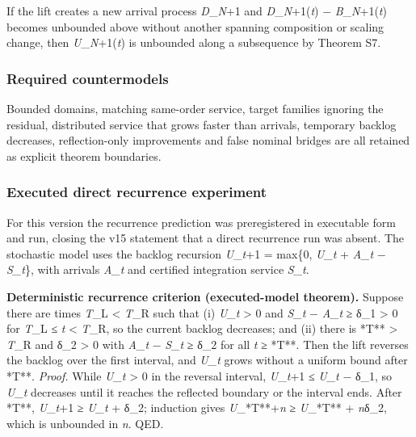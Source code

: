 If the lift creates a new arrival process \emph{D}\_\emph{N}+1 and
\emph{D}\_\emph{N}+1(\emph{t}) − \emph{B}\_\emph{N}+1(\emph{t}) becomes
unbounded above without another spanning composition or scaling change,
then \emph{U}\_\emph{N}+1(\emph{t}) is unbounded along a subsequence by
Theorem S7.

\hypertarget{required-countermodels}{%
\subsubsection{Required countermodels}\label{required-countermodels}}

Bounded domains, matching same-order service, target families ignoring
the residual, distributed service that grows faster than arrivals,
temporary backlog decreases, reflection-only improvements and false
nominal bridges are all retained as explicit theorem boundaries.

\hypertarget{executed-direct-recurrence-experiment}{%
\subsubsection{Executed direct recurrence
experiment}\label{executed-direct-recurrence-experiment}}

For this version the recurrence prediction was preregistered in
executable form and run, closing the v15 statement that a direct
recurrence run was absent. The stochastic model uses the backlog
recursion \emph{U}\_\emph{t}+1 = max\{0, \emph{U\_t} + \emph{A\_t} −
\emph{S\_t}\}, with arrivals \emph{A\_t} and certified integration
service \emph{S\_t}.

\textbf{Deterministic recurrence criterion (executed-model theorem).}
Suppose there are times \emph{T}\_L \textless{} \emph{T}\_R such that
(i) \emph{U\_t} \textgreater{} 0 and \emph{S\_t} − \emph{A\_t} ≥ δ\_1
\textgreater{} 0 for \emph{T}\_L ≤ \emph{t} \textless{} \emph{T}\_R, so
the current backlog decreases; and (ii) there is *T** \textgreater{}
\emph{T}\_R and δ\_2 \textgreater{} 0 with \emph{A\_t} − \emph{S\_t} ≥
δ\_2 for all \emph{t} ≥ *T**. Then the lift reverses the backlog over
the first interval, and \emph{U\_t} grows without a uniform bound after
*T**. \emph{Proof.} While \emph{U\_t} \textgreater{} 0 in the reversal
interval, \emph{U}\_\emph{t}+1 ≤ \emph{U\_t} − δ\_1, so \emph{U\_t}
decreases until it reaches the reflected boundary or the interval ends.
After *T**, \emph{U}\_\emph{t}+1 ≥ \emph{U\_t} + δ\_2; induction gives
\emph{U}\_*T**+\emph{n} ≥ \emph{U}\_*T** + \emph{n}δ\_2, which is
unbounded in \emph{n}. QED.

